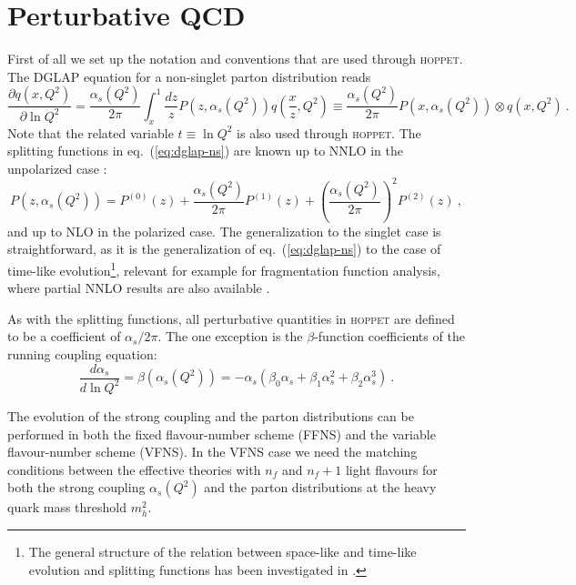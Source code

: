 \documentclass[12pt]{article}
\newcommand{\lp}{\left(}
\newcommand{\rp}{\right)}
\newcommand{\aq}{\alpha_s\left( Q^2 \right)}
\newcommand{\as}{\alpha_s}
\newcommand{\hoppet}{\textsc{hoppet}\xspace}
\begin{document}
\section{Perturbative QCD}
\label{sec:pqcd}
First of all we set up the notation and
conventions that are used through \hoppet. The DGLAP
equation for a non-singlet parton distribution reads
\begin{equation}
  \label{eq:dglap-ns}
  \frac{\partial q(x,Q^2)}{\partial \ln Q^2} = 
\frac{\aq}{2\pi}\int_x^1 \frac{dz}{z}
  P(z,\aq) q\lp \frac{x}{z},Q^2\rp \equiv 
\frac{\aq}{2\pi}  P(x,\aq) \otimes q\lp x,Q^2\rp \ .
\end{equation}
Note that the related variable $t\equiv \ln Q^2$ is also used
through \hoppet.
The splitting functions in  eq.~(\ref{eq:dglap-ns})
are known up to NNLO in the 
unpolarized case \cite{NNLO-NS,NNLO-singlet}:
\begin{equation}
  \label{eq:dpdf}
   P(z,\aq)=P^{(0)}(z)+\frac{\aq}{2\pi}P^{(1)}(z)+
\lp \frac{\aq}{2\pi} \rp^2 P^{(2)}(z) \ ,
\end{equation}
and up to NLO in the polarized case.
The generalization to the singlet case is straightforward, as it
is the generalization of eq.~(\ref{eq:dglap-ns}) to the case
of time-like evolution\footnote{
The general structure of the relation between space-like
and time-like evolution and splitting functions
 has been investigated in \cite{Dokshitzer:2005bf,Mitov:2006ic,Basso:2006nk,Dokshitzer:2006nm,Beccaria:2007bb}.}, 
relevant for example for fragmentation function analysis,
where partial NNLO results
are also available \cite{Mitov:2006ic}.


As with the splitting functions, all perturbative quantities in
\hoppet are defined to be a coefficient of $\as/2\pi$. The one
exception is the $\beta$-function coefficients of the running
coupling equation:
\begin{equation}
  \label{eq:as-ev}
  \frac{d\as}{d\ln Q^2} = \beta\lp \aq\rp = -\as (\beta_0\as +
  \beta_1\as^2 + 
  \beta_2\as^3) \ .
\end{equation}

The evolution of the strong coupling and the parton distributions can
be performed in both the fixed flavour-number scheme (FFNS) and the 
variable flavour-number scheme (VFNS). In the VFNS case we 
need the matching conditions between the effective
theories with $n_f$ and $n_{f}+1$ light flavours for both the strong 
coupling $\aq$ and the parton distributions at the heavy quark
mass threshold $m_h^2$.
\end{document}
